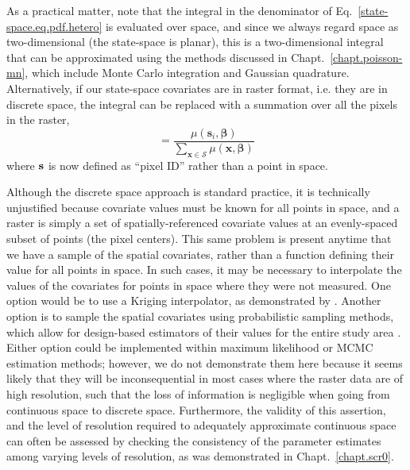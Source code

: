 As a practical matter, note that the integral in the
denominator of Eq.~\ref{state-space.eq.pdf.hetero} is evaluated over
space, and since we always regard space as two-dimensional (the
state-space is planar), this is a two-dimensional integral that can
be approximated using the methods discussed in
Chapt.~\ref{chapt.poisson-mn}, which include
Monte Carlo integration and Gaussian quadrature. Alternatively, if
our state-space covariates are in raster format, i.e. they are
in discrete space, the integral can be replaced with a summation over
all the pixels in the raster,
\begin{equation}
[\mathbf{s}_i | \bm{\beta}] = \frac{\mu(\mathbf{s}_i, \bm{\beta})}{\sum_{\mathbf{x} \in \mathcal{S}} \mu(\mathbf{x}, \bm{\beta})}
\label{state-space.eq.pdf.hetero.d}
\end{equation}
where $\bf s$ is now defined as ``pixel ID'' rather than a point in space.

Although the discrete space approach is standard practice, it is
technically unjustified because covariate values must be known for all
points in space, and a raster is simply a set of spatially-referenced
covariate values at an evenly-spaced subset of points (the pixel
centers). This same problem is present anytime that we have a
sample of the spatial covariates, rather than a function defining
their value for all points in space. In such cases, it may be necessary to
interpolate the values of the covariates for points in space where
they were not measured. One option would be to use a Kriging
interpolator, as demonstrated by \citet{rathbun:1996}. Another option
is to sample the spatial covariates using probabilistic sampling
methods, which allow for design-based estimators of their values for
the entire study area \citep{rathbun_etal:2007}. Either option could
be implemented within maximum likelihood or MCMC estimation methods;
however,
we do not demonstrate them here
because it seems likely that they will be inconsequential in most
cases where the raster data are of high resolution, such that the loss
of information is negligible when going from continuous space to
discrete space. Furthermore, the validity of this assertion, and the
level of resolution required to adequately approximate continuous
space can often be assessed by checking the consistency of the
parameter estimates among varying levels of resolution, as was
demonstrated in Chapt.~\ref{chapt.scr0}.

